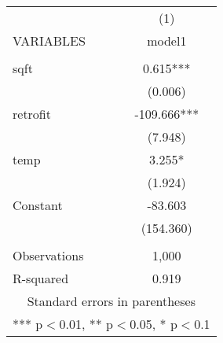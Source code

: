 \documentclass[]{article}
\begin{document}
\begin{tabular}{lc} \hline
 & (1) \\
VARIABLES & model1 \\ \hline
 &  \\
sqft & 0.615*** \\
 & (0.006) \\
retrofit & -109.666*** \\
 & (7.948) \\
temp & 3.255* \\
 & (1.924) \\
Constant & -83.603 \\
 & (154.360) \\
 &  \\
Observations & 1,000 \\
 R-squared & 0.919 \\ \hline
\multicolumn{2}{c}{ Standard errors in parentheses} \\
\multicolumn{2}{c}{ *** p$<$0.01, ** p$<$0.05, * p$<$0.1} \\
\end{tabular}
\end{document}

